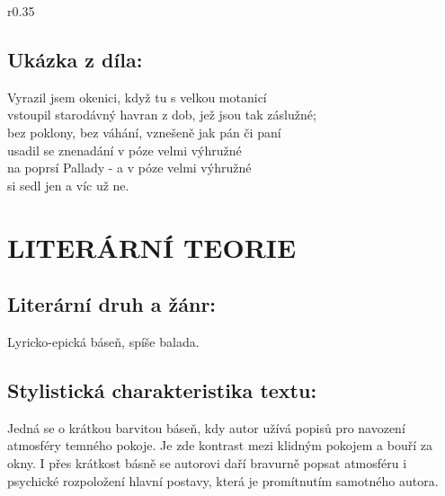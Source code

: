 \documentclass[A4paper]{extarticle} %
\begin{document}
\noindent\begin{wrapfigure}{r}{0.35\textwidth}
\tiny

\subsection*{Ukázka z díla:}
\setlength{\parindent}{3pt}
\begin{center}
\noindent
Vyrazil jsem okenici, když tu s velkou motanicí \\
vstoupil starodávný havran z dob, jež jsou tak záslužné; \\
bez poklony, bez váhání, vznešeně jak pán či paní \\
usadil se znenadání v póze velmi výhružné \\
na poprsí Pallady - a v póze velmi výhružné \\
si sedl jen a víc už ne. 
\end{center}
\end{wrapfigure}

\section*{LITERÁRNÍ TEORIE}

\subsection*{Literární druh a žánr:}
\noindent 
Lyricko-epická báseň, spíše balada.





\subsection*{Stylistická charakteristika textu:}
\noindent 
Jedná se o krátkou barvitou báseň, kdy autor užívá popisů pro navození atmosféry temného pokoje. Je zde kontrast mezi klidným pokojem a bouří za okny. I přes krátkost básně se autorovi daří bravurně popsat atmosféru i psychické rozpoložení hlavní postavy, která je promítnutím samotného autora.
\end{document}
